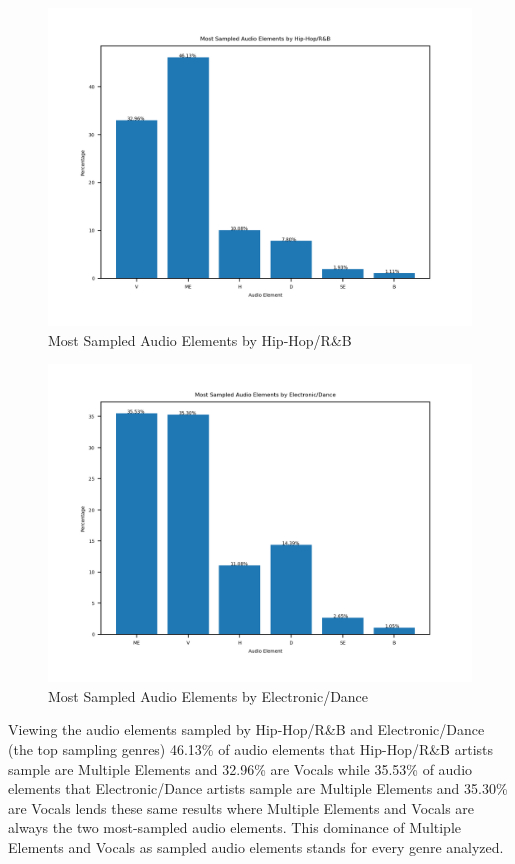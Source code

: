 \documentclass[pageno]{jpaper}
\begin{document}
\begin{figure}[H]
\includegraphics{./audioElemSampledBy/audioElemHiphop}
\caption{Most Sampled Audio Elements by Hip-Hop/R\&B}
\centering
\end{figure}
\begin{figure}[H]
\includegraphics{./audioElemSampledBy/audioElemElectronic}
\caption{Most Sampled Audio Elements by Electronic/Dance}
\centering
\end{figure}
Viewing the audio elements sampled by Hip-Hop/R\&B and Electronic/Dance (the top sampling genres) 46.13\% of audio elements that Hip-Hop/R\&B artists sample are Multiple Elements and 32.96\% are Vocals while 35.53\% of audio elements that Electronic/Dance artists sample are Multiple Elements and 35.30\% are Vocals lends these same results where Multiple Elements and Vocals are always the two most-sampled audio elements. This dominance of Multiple Elements and Vocals as sampled audio elements stands for every genre analyzed.
\end{document}
